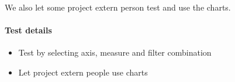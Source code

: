  We also let some project extern person test and use the charts.

\paragraph{Test details}
\begin{itemize}
  \item Test by selecting axis, measure and filter combination
  \item Let project extern people use charts
\end{itemize}

